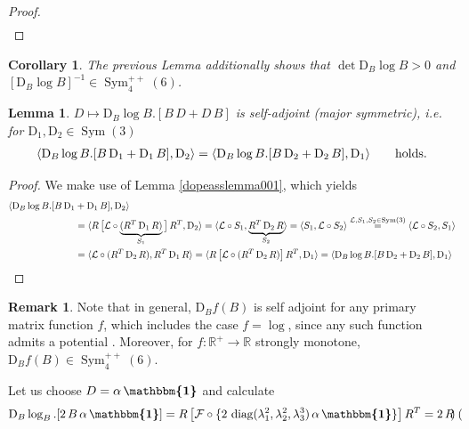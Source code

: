 \documentclass[10pt]{article}
\newcounter{theoremCounter}
\numberwithin{theoremCounter}{section}
\theoremstyle{plain}
\newtheorem{lem}[theoremCounter]{Lemma}
\newtheorem{cor}[theoremCounter]{Corollary}
\theoremstyle{definition}
\newtheorem{rem}[theoremCounter]{Remark}
\newcommand{\id}{{\boldsymbol{\mathbbm{1}}}}
\newcommand{\R}{\mathbb{R}}
\newcommand{\DD}{\mathrm{D}}
\DeclareMathOperator{\diag}{diag}
\DeclareMathOperator{\Sym}{Sym}
\numberwithin{equation}{section}
\begin{document}
\begin{appendix}
\begin{proof}
\begin{align}
		\end{align}
	\end{proof}
%
	\begin{cor}
	The previous Lemma additionally shows that $\det \DD_B \log B > 0$ and $[\DD_B \log B]^{-1} \in \Sym^{++}_4(6)$.
	\end{cor}
%
	\begin{lem}
	$D \mapsto \DD_B \log B . [B \, D + D \, B]$ is self-adjoint (major symmetric), i.e. for $\DD_1, \DD_2 \in \Sym(3)$
	\begin{align}
	\langle \DD_B \log B . [B \, \DD_1 + \DD_1 \, B], \DD_2 \rangle = \langle \DD_B \log B . [B \, \DD_2 + \DD_2 \, B], \DD_1 \rangle \qquad \textnormal{holds.}
	\end{align}
	\end{lem}
%
	\begin{proof}
	We make use of Lemma \ref{dopeasslemma001}, which yields
		\begin{align}
		\langle \DD_B \log B . [B \, \DD_1 &+ \DD_1 \, B], \DD_2 \rangle \notag \\
		&= \langle R \, \big[ \mathcal{L} \circ \underbrace{(R^T \, \DD_1 \, R)}_{S_1} \big] \, R^T, \DD_2 \rangle = \langle \mathcal{L} \circ S_1 , \underbrace{R^T \, \DD_2 \, R}_{S_2} \rangle = \langle S_1 , \mathcal{L} \circ S_2 \rangle \overset{\mathcal{L}, S_1, S_2 \in \Sym(3)} = \langle \mathcal{L} \circ S_2 , S_1 \rangle \\
		&= \langle \mathcal{L} \circ (R^T \, \DD_2 \, R) , R^T \, \DD_1 \, R \rangle = \langle R \, \big[ \mathcal{L} \circ (R^T \, \DD_2 \, R) \big] \, R^T, \DD_1 \rangle = \langle \DD_B \log B . [B \, \DD_2 + \DD_2 \, B], \DD_1 \rangle \notag \qedhere
		\end{align}
	\end{proof}
%
	\begin{rem}
		Note that in general, $\DD_Bf(B)$ is self adjoint for any primary matrix function $f$, which includes the case $f=\log$, since any such function admits a potential \cite{NeffMartin14}. Moreover, for $f: \R^+ \to \R$ strongly monotone, $\DD_B f(B) \in \Sym^{++}_4(6)$.
	\end{rem}
%
	Let us choose $D = \alpha \, \id$ and calculate
	\begin{equation}
	\begin{alignedat}{2}
	\DD_B \log_B . [2 \, B \, \alpha \, \id] &= R \, \big[\mathcal{F} \circ \{2 \, \diag(\lambda_1^2, \lambda_2^2, \lambda_3^3) \, \alpha \, \id \} \big] \, R^T = 2 \, R \,
	\begin{pmatrix}

\end{pmatrix}
\end{alignedat}
\end{equation}
\end{appendix}
\end{document}
